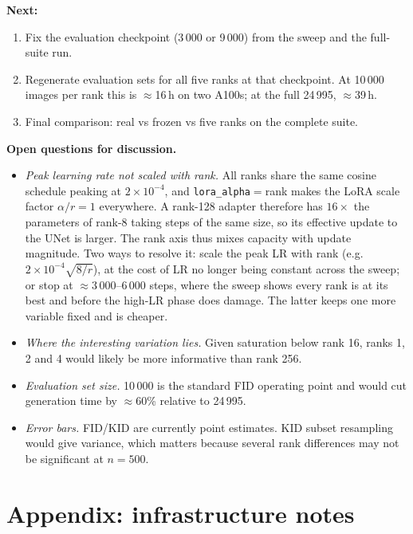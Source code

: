 \documentclass[11pt,a4paper]{article}
\begin{document}
\textbf{Next:}
\begin{enumerate}
\item Fix the evaluation checkpoint (3\,000 or 9\,000) from the sweep and the
full-suite run.
\item Regenerate evaluation sets for all five ranks at that checkpoint.
At 10\,000 images per rank this is $\approx$16\,h on two A100s; at the full
24\,995, $\approx$39\,h.
\item Final comparison: real vs frozen vs five ranks on the complete suite.
\end{enumerate}

\textbf{Open questions for discussion.}
\begin{itemize}
\item \emph{Peak learning rate not scaled with rank.} All ranks share the same
cosine schedule peaking at $2\times10^{-4}$, and \texttt{lora\_alpha}$=$rank
makes the LoRA scale factor $\alpha/r = 1$ everywhere. A rank-128 adapter
therefore has $16\times$ the parameters of rank-8 taking steps of the same size,
so its effective update to the UNet is larger. The rank axis thus mixes capacity
with update magnitude. Two ways to resolve it: scale the peak LR with rank
(e.g.\ $2\times10^{-4}\sqrt{8/r}$), at the cost of LR no longer being constant
across the sweep; or stop at $\approx$3\,000--6\,000 steps, where the sweep shows
every rank is at its best and before the high-LR phase does damage. The latter
keeps one more variable fixed and is cheaper.
\item \emph{Where the interesting variation lies.} Given saturation below rank
16, ranks 1, 2 and 4 would likely be more informative than rank 256.
\item \emph{Evaluation set size.} 10\,000 is the standard FID operating point and
would cut generation time by $\approx$60\% relative to 24\,995.
\item \emph{Error bars.} FID/KID are currently point estimates. KID subset
resampling would give variance, which matters because several rank differences
may not be significant at $n=500$.
\end{itemize}

\section*{Appendix: infrastructure notes}
\end{document}
